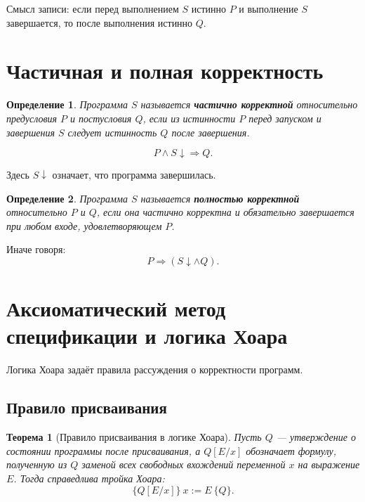 \documentclass[12pt,a4paper]{article}
\newtheorem{definition}{Определение}
\newtheorem{theorem}{Теорема}
\begin{document}
Смысл записи:
если перед выполнением $S$ истинно $P$ и выполнение $S$ завершается, то после выполнения истинно $Q$.

\section{Частичная и полная корректность}

\begin{definition}
Программа $S$ называется \textbf{частично корректной} относительно предусловия $P$ и постусловия $Q$, если из истинности $P$ перед запуском и завершения $S$ следует истинность $Q$ после завершения.
\end{definition}

\[
    P \land S\downarrow \Rightarrow Q.
\]

Здесь $S\downarrow$ означает, что программа завершилась.

\begin{definition}
Программа $S$ называется \textbf{полностью корректной} относительно $P$ и $Q$, если она частично корректна и обязательно завершается при любом входе, удовлетворяющем $P$.
\end{definition}

Иначе говоря:
\[
    P \Rightarrow (S\downarrow \land Q).
\]

\section{Аксиоматический метод спецификации и логика Хоара}

Логика Хоара задаёт правила рассуждения о корректности программ.

\subsection{Правило присваивания}

\begin{theorem}[Правило присваивания в логике Хоара]
Пусть $Q$ --- утверждение о состоянии программы после присваивания, а $Q[E/x]$ обозначает формулу, полученную из $Q$ заменой всех свободных вхождений переменной $x$ на выражение $E$.
Тогда справедлива тройка Хоара:
\[
    \{Q[E/x]\}\ x := E\ \{Q\}.
\]
\end{theorem}
\end{document}
